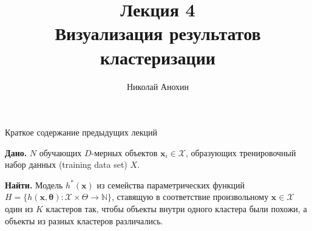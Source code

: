 \documentclass[10pt]{beamer}
\author{Николай Анохин}
\title{\newline \newline \newline Лекция 4 \\ Визуализация результатов кластеризации}
\let\otp\titlepage
\renewcommand{\titlepage}{\otp\addtocounter{framenumber}{-1}}
\begin{document}
\begin{frame}[plain]
\titlepage
\end{frame}

\begin{frame}{Краткое содержание предыдущих лекций}

{\bf Дано.} $N$ обучающих $D$-мерных объектов $\mathbf{x}_i \in \mathcal{X}$, образующих тренировочный набор данных (training data set) $X$.

\vspace{1em}
{\bf Найти.} Модель $h^*(\mathbf{x})$ из семейства параметрических функций $H = \{h(\mathbf{x, \mathbf{\theta}}): \mathcal{X} \times \Theta \rightarrow \mathbb{N}\}$, ставящую в соответствие произвольному $\mathbf{x} \in \mathcal{X}$ один из $K$ кластеров так, чтобы объекты внутри одного кластера были похожи, а объекты из разных кластеров различались.

\end{frame}
\end{document}
